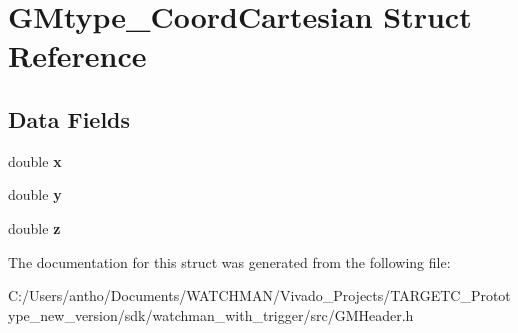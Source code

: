 \section{G\+Mtype\+\_\+\+Coord\+Cartesian Struct Reference}
\label{struct_g_mtype___coord_cartesian}
\subsection*{Data Fields}
\begin{DoxyCompactItemize}
\item 
\mbox{\label{struct_g_mtype___coord_cartesian_af88b946fb90d5f08b5fb740c70e98c10}} 
double {\bfseries x}
\item 
\mbox{\label{struct_g_mtype___coord_cartesian_ab927965981178aa1fba979a37168db2a}} 
double {\bfseries y}
\item 
\mbox{\label{struct_g_mtype___coord_cartesian_ab3e6ed577a7c669c19de1f9c1b46c872}} 
double {\bfseries z}
\end{DoxyCompactItemize}


The documentation for this struct was generated from the following file\+:\begin{DoxyCompactItemize}
\item 
C\+:/\+Users/antho/\+Documents/\+W\+A\+T\+C\+H\+M\+A\+N/\+Vivado\+\_\+\+Projects/\+T\+A\+R\+G\+E\+T\+C\+\_\+\+Prototype\+\_\+new\+\_\+version/sdk/watchman\+\_\+with\+\_\+trigger/src/G\+M\+Header.\+h\end{DoxyCompactItemize}
